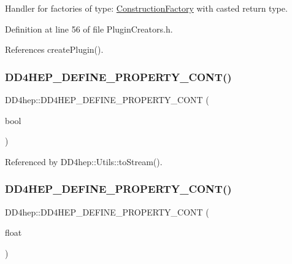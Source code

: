 Handler for factories of type\+: \hyperlink{class_d_d4hep_1_1_construction_factory}{Construction\+Factory} with casted return type. 



Definition at line 56 of file Plugin\+Creators.\+h.



References create\+Plugin().

\hypertarget{namespace_d_d4hep_a2a12fc15eee252853c7dae0c8c10289c}{}\label{namespace_d_d4hep_a2a12fc15eee252853c7dae0c8c10289c} 
\subsubsection{\texorpdfstring{D\+D4\+H\+E\+P\+\_\+\+D\+E\+F\+I\+N\+E\+\_\+\+P\+R\+O\+P\+E\+R\+T\+Y\+\_\+\+C\+O\+N\+T()}{DD4HEP\_DEFINE\_PROPERTY\_CONT()}\hspace{0.1cm}{\footnotesize\ttfamily [1/4]}}
{\footnotesize\ttfamily D\+D4hep\+::\+D\+D4\+H\+E\+P\+\_\+\+D\+E\+F\+I\+N\+E\+\_\+\+P\+R\+O\+P\+E\+R\+T\+Y\+\_\+\+C\+O\+NT (\begin{DoxyParamCaption}\item[{bool}]{ }\end{DoxyParamCaption})}



Referenced by D\+D4hep\+::\+Utils\+::to\+Stream().

\hypertarget{namespace_d_d4hep_ae9ef794f55e34dba969074941408b572}{}\label{namespace_d_d4hep_ae9ef794f55e34dba969074941408b572} 
\subsubsection{\texorpdfstring{D\+D4\+H\+E\+P\+\_\+\+D\+E\+F\+I\+N\+E\+\_\+\+P\+R\+O\+P\+E\+R\+T\+Y\+\_\+\+C\+O\+N\+T()}{DD4HEP\_DEFINE\_PROPERTY\_CONT()}\hspace{0.1cm}{\footnotesize\ttfamily [2/4]}}
{\footnotesize\ttfamily D\+D4hep\+::\+D\+D4\+H\+E\+P\+\_\+\+D\+E\+F\+I\+N\+E\+\_\+\+P\+R\+O\+P\+E\+R\+T\+Y\+\_\+\+C\+O\+NT (\begin{DoxyParamCaption}\item[{float}]{ }\end{DoxyParamCaption})}

